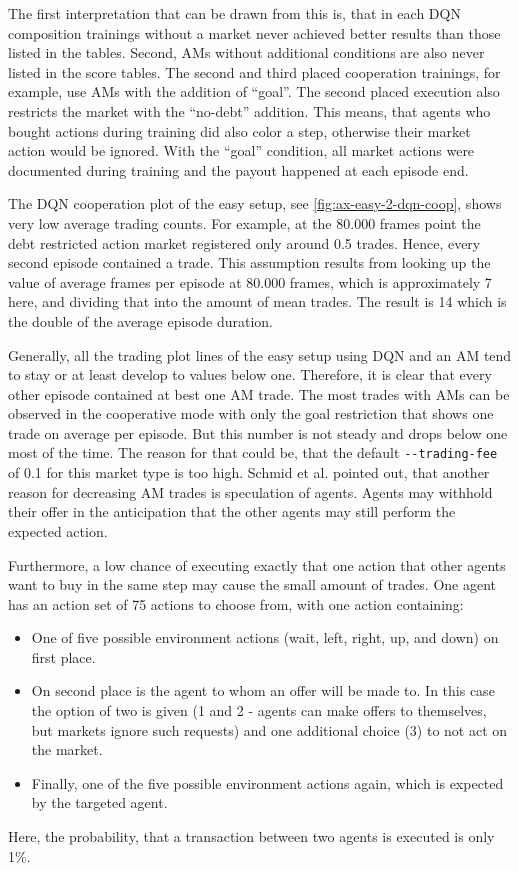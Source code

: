 The first interpretation that can be drawn from this is, that in each DQN composition trainings without a market never achieved better results than those listed in the tables. Second, AMs without additional conditions are also never listed in the score tables. The second and third placed cooperation trainings, for example, use AMs with the addition of ``goal''. The second placed execution also restricts the market with the ``no-debt'' addition. This means, that agents who bought actions during training did also color a step, otherwise their market action would be ignored. With the ``goal'' condition, all market actions were documented during training and the payout happened at each episode end.

The DQN cooperation plot of the easy setup, see \ref{fig:ax-easy-2-dqn-coop}, shows very low average trading counts. For example, at the 80.000 frames point the debt restricted action market registered only around 0.5 trades. Hence, every second episode contained a trade. This assumption results from looking up the value of average frames per episode at 80.000 frames, which is approximately 7 here, and dividing that into the amount of mean trades. The result is 14 which is the double of the average episode duration. 

Generally, all the trading plot lines of the easy setup using DQN and an AM tend to stay or at least develop to values below one. Therefore, it is clear that every other episode contained at best one AM trade. The most trades with AMs can be observed in the cooperative mode with only the goal restriction that shows one trade on average per episode. But this number is not steady and drops below one most of the time. The reason for that could be, that the default \verb|--trading-fee| of 0.1 for this market type is too high. Schmid et al. \cite{scbe18} pointed out, that another reason for decreasing AM trades is speculation of agents. Agents may withhold their offer in the anticipation that the other agents may still perform the expected action.

Furthermore, a low chance of executing exactly that one action that other agents want to buy in the same step may cause the small amount of trades. One agent has an action set of 75 actions to choose from, with one action containing:
\begin{itemize}
    \item One of five possible environment actions (wait, left, right, up, and down) on first place.
    \item On second place is the agent to whom an offer will be made to. In this case the option of two is given (1 and 2 - agents can make offers to themselves, but markets ignore such requests) and one additional choice (3) to not act on the market.
    \item Finally, one of the five possible environment actions again, which is expected by the targeted agent.
\end{itemize}
Here, the probability, that a transaction between two agents is executed is only 1\%. 


